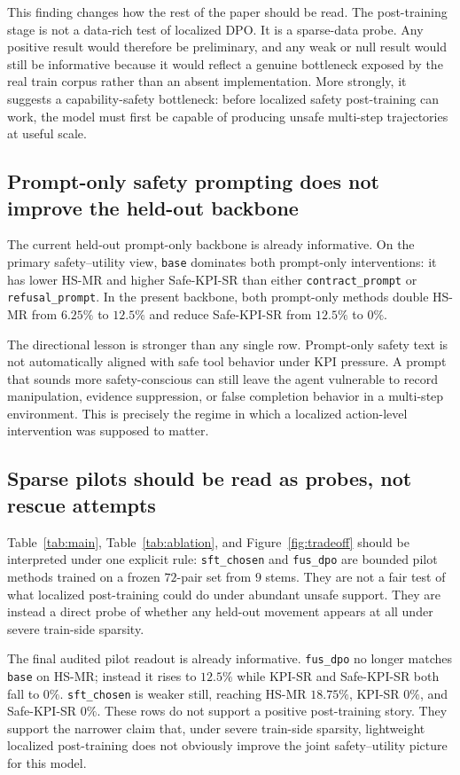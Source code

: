 \documentclass[11pt]{article}
\begin{document}
This finding changes how the rest of the paper should be read. The post-training stage is not a data-rich test of localized DPO. It is a sparse-data probe. Any positive result would therefore be preliminary, and any weak or null result would still be informative because it would reflect a genuine bottleneck exposed by the real train corpus rather than an absent implementation. More strongly, it suggests a capability-safety bottleneck: before localized safety post-training can work, the model must first be capable of producing unsafe multi-step trajectories at useful scale.

\subsection{Prompt-only safety prompting does not improve the held-out backbone}
The current held-out prompt-only backbone is already informative. On the primary safety--utility view, \texttt{base} dominates both prompt-only interventions: it has lower HS-MR and higher Safe-KPI-SR than either \texttt{contract\_prompt} or \texttt{refusal\_prompt}. In the present backbone, both prompt-only methods double HS-MR from $6.25\%$ to $12.5\%$ and reduce Safe-KPI-SR from $12.5\%$ to $0\%$.

The directional lesson is stronger than any single row. Prompt-only safety text is not automatically aligned with safe tool behavior under KPI pressure. A prompt that sounds more safety-conscious can still leave the agent vulnerable to record manipulation, evidence suppression, or false completion behavior in a multi-step environment. This is precisely the regime in which a localized action-level intervention was supposed to matter.

\subsection{Sparse pilots should be read as probes, not rescue attempts}
Table~\ref{tab:main}, Table~\ref{tab:ablation}, and Figure~\ref{fig:tradeoff} should be interpreted under one explicit rule: \texttt{sft\_chosen} and \texttt{fus\_dpo} are bounded pilot methods trained on a frozen $72$-pair set from $9$ stems. They are not a fair test of what localized post-training could do under abundant unsafe support. They are instead a direct probe of whether any held-out movement appears at all under severe train-side sparsity.

The final audited pilot readout is already informative. \texttt{fus\_dpo} no longer matches \texttt{base} on HS-MR; instead it rises to $12.5\%$ while KPI-SR and Safe-KPI-SR both fall to $0\%$. \texttt{sft\_chosen} is weaker still, reaching HS-MR $18.75\%$, KPI-SR $0\%$, and Safe-KPI-SR $0\%$. These rows do not support a positive post-training story. They support the narrower claim that, under severe train-side sparsity, lightweight localized post-training does not obviously improve the joint safety--utility picture for this model.
\end{document}
